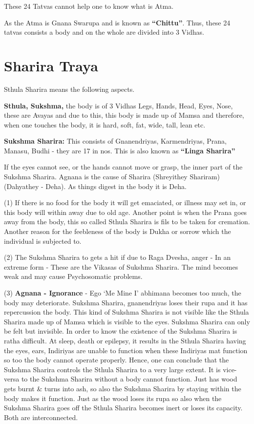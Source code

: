 These 24 Tatvas cannot help one to know what is Atma.

As the Atma is Gnana Swarupa and is known as \textbf{“Chittu”}. Thus, these 24 tatvas consists a body and on the whole are divided into 3 Vidhas.

\chapter{Sharira Traya}

Sthula Sharira means the following aspects.

\textbf{Sthula, Sukshma,} the body is of 3 Vidhas Legs, Hands, Head, Eyes, Nose, these are Avayas and due to this, this body is made up of Mamsa and therefore, when one touches the body, it is hard, soft, fat, wide, tall, lean etc.

\textbf{Sukshma Sharira:} This consists of Gnanendriyas, Karmendriyas, Prana, Manasu, Budhi - they are 17 in nos. This is also known as \textbf{“Linga Sharira”}

If the eyes cannot see, or the hands cannot move or grasp, the inner part of the Sukshma Sharira. Agnana is the cause of Sharira (Shreyithey Shariram) (Dahyathey - Deha). As things digest in the body it is Deha.

(1) If there is no food for the body it will get emaciated, or illness may set in, or this body will within away due to old age. Another point is when the Prana goes away from the body, this so called Sthula Sharira is fils to be taken for cremation. Another reason for the feebleness of the body is Dukha or sorrow which the individual is subjected to.

(2) The Sukshma Sharira to gets a hit if due to Raga Dvesha, anger - In an extreme form - These are the Vikasas of Sukshma Sharira. The mind becomes weak and may cause Psychosomatic problems.

(3) \textbf{Agnana - Ignorance} - Ego ‘Me Mine I’ abhimana becomes too much, the body may deteriorate. Sukshma Sharira, gnanendriyas loses their rupa and it has repercussion the body. This kind of Sukshma Sharira is not visible like the Sthula Sharira made up of Mamsa which is visible to the eyes. Sukshma Sharira can only be felt but invisible. In order to know the existence of the Sukshma Sharira is ratha difficult. At sleep, death or epilepsy, it results in the Sthula Sharira having the eyes, ears, Indiriyas are unable to function when these Indiriyas mat function so too the body cannot operate properly. Hence, one can conclude that the Sukshma Sharira controls the Sthula Sharira to a very large extent. It is vice-versa to the Sukshma Sharira without a body cannot function. Just has wood gets burnt \& turns into ash, so also the Sukshma Sharira by staying within the body makes it function. Just as the wood loses its rupa so also when the Sukshma Sharira goes off the Sthula Sharira becomes inert or loses its capacity. Both are interconnected.

